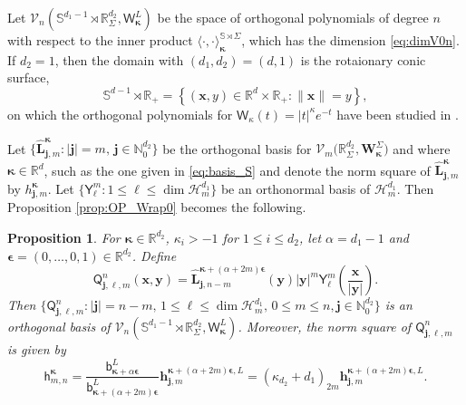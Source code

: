 \documentclass{amsart}
\newtheorem{prop}[thm]{Proposition}
\theoremstyle{remark}
\def\la{{\langle}}
\def\ra{{\rangle}}
\def\sph{{\mathbb{S}^{d-1}}}
\def\sb{{\mathsf b}}
\def\sh{{\mathsf h}}
\def\sQ{{\mathsf Q}}
\def\sW{{\mathsf W}}
\def\sY{{\mathsf Y}}
\def\a{{\alpha}}
\def\k{{\kappa}}
\def\la{{\langle}}
\def\ra{{\rangle}}
\def\Lb{{\bm L}}
\def\Wb{{\bm W}}
\def\CH{{\mathcal H}}
\def\CV{{\mathcal V}}
\def\NN{{\mathbb N}}
\def\RR{{\mathbb R}}
\def\SS{{\mathbb S}}
\def\VV{{\mathbb V}}
\def\bep{{\boldsymbol{\epsilon}}}
\def\bk{{\boldsymbol{\kappa}}}
\begin{document}
Let $\CV_n(\SS^{d_1-1}\! \rtimes \RR_\Sigma^{d_2}, \sW^L_{\bk})$ be the space of orthogonal polynomials 
of degree $n$ with respect to the inner product $\la \cdot, \cdot\ra_{\bk}^{\SS\rtimes \Sigma}$, which has the
dimension \eqref{eq:dimV0n}. If $d_2 =1$, then the domain with $(d_1,d_2) = (d,1)$ is the rotaionary conic surface,  
$$
  \sph \!\rtimes \RR_+ = \left\{(\bm x,y) \in \RR^d \times \RR_+: \|\bm x\| = y\right\}, 
$$
on which the orthogonal polynomials for $\sW_{\k}(t) = |t|^\k e^{-t}$ have been studied in \cite{X20}. 

Let $\{\hat \Lb_{\bm j, m}^{\bk}: |\bm j| = m, \, \bm j\in \NN_0^{d_2}\}$ be the orthogonal basis for 
$\CV_{m}\big(\RR_\Sigma^{d_2}, \Wb_{\bk}^\Sigma \big)$ and 
where $\bk \in \RR^{d}$, such as the one given in \eqref{eq:basis_S} and denote the norm square of
$\hat \Lb_{\bm j, m}^{\bk}$ by $h_{\bm j,m}^{\bk}$. Let $\{\sY_\ell^m: 1 \le \ell \le  \dim \CH_m^{d_1}\}$
be an orthonormal basis of $\CH_m^{d_1}$. Then Proposition \ref{prop:OP_Wrap0} becomes the following.

\begin{prop}
For $\bk \in \RR^{d_2}$, $\k_i  >  -1$ for $1 \le i \le d_2$, let $\a = d_1-1$ and 
$\bep = (0,\ldots,0,1) \in \RR^{d_2}$. Define 
\begin{equation} \label{eq:SL0_OP}
 \sQ_{\bm j, \ell, m}^n(\bm x,\bm y) = \hat \Lb_{\bm j, n-m}^{\bk+ (\a+2m)\bep}(\bm y) |\bm y|^m 
      \sY_{\ell}^m \left(\frac{\bm x}{|\bm y|}\right). 
\end{equation}
Then $\{\sQ_{\bm j, \ell, m}^n: |\bm j| = n-m, \, 1 \le \ell \le \dim \CH_m^{d_1}, \, 0 \le m  \le n, \bm j \in \NN_0^{d_2}\}$ 
is an orthogonal basis of $\CV_n(\SS^{d_1-1}\!\! \rtimes \RR_\Sigma^{d_2}, \sW_{\bk}^L)$. Moreover, 
the norm square of $\sQ_{\bm j, \ell, m}^n$ is given by 
\begin{equation} \label{eq:SL0_Norm}
   \sh_{m,n}^{\bk}  %
       =   \frac{\sb^L_{\bk+ \alpha\bep}}{\sb^L_{\bk+(\alpha + 2m) \bep}} \bm h_{\bm j,m}^{\bk+(\a+ 2m)\bep, L}
       =  (\k_{d_2} +d_1)_{2m}  \bm h_{\bm j,m}^{\bk+(\a+ 2m)\bep, L}.  
\end{equation}
\end{prop}
 
\end{document}
